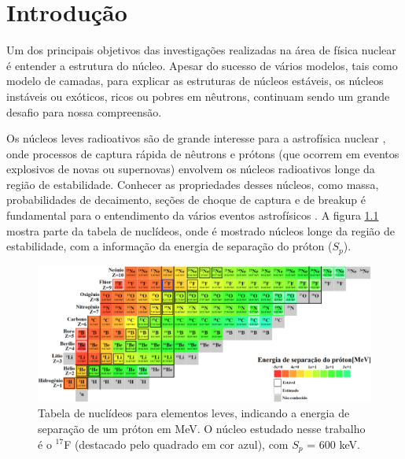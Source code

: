 \documentclass[a4paper,12pt,oneside]{book}
\begin{document}
\tableofcontents
\listoffigures
\newpage

\chapter{Introdução}


\par Um dos principais objetivos das investigações realizadas na área de física nuclear é entender a estrutura do núcleo. Apesar do sucesso de vários modelos, tais como modelo de camadas, para explicar as estruturas de núcleos estáveis, os núcleos instáveis ou exóticos, ricos ou pobres em nêutrons, continuam sendo um grande desafio para nossa compreensão.

\par Os núcleos leves radioativos são de grande interesse para a astrofísica nuclear \cite{BARDAYAN2017415}, onde processos de captura rápida de nêutrons e prótons (que ocorrem em eventos explosivos de novas ou supernovas) envolvem os núcleos radioativos longe da região de estabilidade. Conhecer as propriedades desses núcleos, como massa, probabilidades de decaimento, seções de choque de captura e de breakup é fundamental para o entendimento da vários eventos astrofísicos \cite{BARDAYAN2017415, abud_mater}. A figura \ref{fig:chart_nuclides} mostra parte da tabela de nuclídeos, onde é mostrado núcleos longe da região de estabilidade, com a informação da energia de separação do próton ($S_p$).

\begin{figure}[H]
    \centering
    \includegraphics[scale = 0.25]{figs/chart_nuclides_2.png}
    \caption{Tabela de nuclídeos para elementos leves, indicando a energia de separação de um próton em MeV. O núcleo estudado nesse trabalho é o $^{17}$F (destacado pelo quadrado em cor azul), com $S_p$ = 600 keV. \cite{colourful_nuclide_chat}}
    \label{fig:chart_nuclides}
\end{figure}
\end{document}
